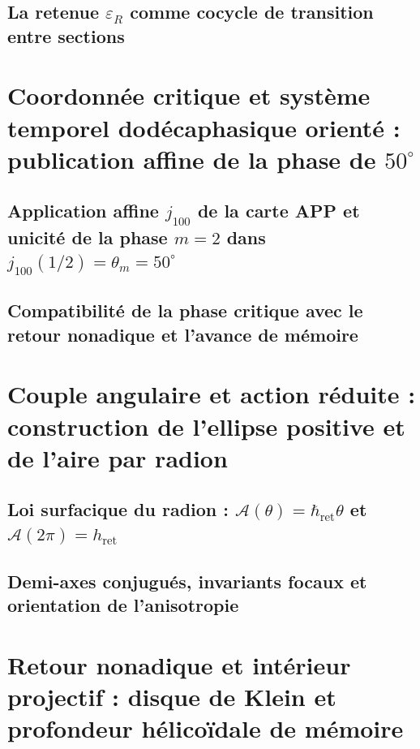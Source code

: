 \subsection{La retenue \(\varepsilon_R\) comme cocycle de transition entre sections}


\section{Coordonnée critique et système temporel dodécaphasique orienté : publication affine de la phase de \(50^\circ\)}
\subsection{Application affine \(j_{100}\) de la carte APP et unicité de la phase \(m=2\) dans \(j_{100}(1/2)=\theta_m=50^\circ\)}

\subsection{Compatibilité de la phase critique avec le retour nonadique et l'avance de mémoire}


\section{Couple angulaire et action réduite : construction de l'ellipse positive et de l'aire par radion}
\subsection{Loi surfacique du radion : \(\mathcal A(\theta)=\hbar_{\mathrm{ret}}\theta\) et \(\mathcal A(2\pi)=h_{\mathrm{ret}}\)}

\subsection{Demi-axes conjugués, invariants focaux et orientation de l'anisotropie}


\section{Retour nonadique et intérieur projectif : disque de Klein et profondeur hélicoïdale de mémoire}
